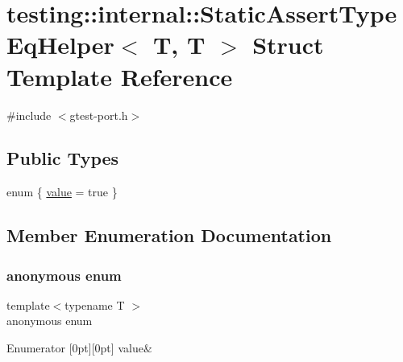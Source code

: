 \hypertarget{structtesting_1_1internal_1_1_static_assert_type_eq_helper_3_01_t_00_01_t_01_4}{}\section{testing\+::internal\+::Static\+Assert\+Type\+Eq\+Helper$<$ T, T $>$ Struct Template Reference}
\label{structtesting_1_1internal_1_1_static_assert_type_eq_helper_3_01_t_00_01_t_01_4}


{\ttfamily \#include $<$gtest-\/port.\+h$>$}

\subsection*{Public Types}
\begin{DoxyCompactItemize}
\item 
enum \{ \mbox{\hyperlink{structtesting_1_1internal_1_1_static_assert_type_eq_helper_3_01_t_00_01_t_01_4_a60099430bf8e5852e046966fcac4be85a63c475f543e4e977d43c5093dd2b7f3f}{value}} = true
 \}
\end{DoxyCompactItemize}


\subsection{Member Enumeration Documentation}
\mbox{\label{structtesting_1_1internal_1_1_static_assert_type_eq_helper_3_01_t_00_01_t_01_4_a60099430bf8e5852e046966fcac4be85}} 
\subsubsection{\texorpdfstring{anonymous enum}{anonymous enum}}
{\footnotesize\ttfamily template$<$typename T $>$ \\
anonymous enum}

\begin{DoxyEnumFields}{Enumerator}
[0pt][0pt]{}\mbox{\label{structtesting_1_1internal_1_1_static_assert_type_eq_helper_3_01_t_00_01_t_01_4_a60099430bf8e5852e046966fcac4be85a63c475f543e4e977d43c5093dd2b7f3f}} 
value&\\
\hline

\end{DoxyEnumFields}


